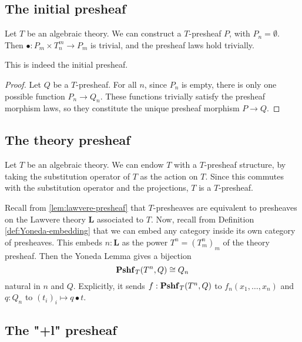 \subsection{The initial presheaf}
\begin{example}
  Let $ T $ be an algebraic theory. We can construct a $ T $-presheaf $ P $, with $ P_n = \emptyset $. Then $ \bullet : P_m \times T_n^m \to P_m $ is trivial, and the presheaf laws hold trivially.
\end{example}

\begin{lemma}
  This is indeed the initial presheaf.
\end{lemma}
\begin{proof}
  Let $ Q $ be a $ T $-presheaf. For all $ n $, since $ P_n $ is empty, there is only one possible function $ P_n \to Q_n $. These functions trivially satisfy the presheaf morphism laws, so they constitute the unique presheaf morphism $ P \to Q $.
\end{proof}

\subsection{The theory presheaf}
\begin{example}
  Let $ T $ be an algebraic theory. We can endow $ T $ with a $ T $-presheaf structure, by taking the substitution operator of $ T $ as the action on $ T $. Since this commutes with the substitution operator and the projections, $ T $ is a $ T $-presheaf.
\end{example}

\begin{remark}\label{rem:presheaf-Yoneda}
  Recall from \ref{lem:lawvere-presheaf} that $ T $-presheaves are equivalent to presheaves on the Lawvere theory $ \mathbf L $ associated to $ T $. Now, recall from Definition \ref{def:Yoneda-embedding} that we can embed any category inside its own category of presheaves. This embeds $ n: \mathbf L $ as the power $ T^n = (T_m^n)_m $ of the theory presheaf. Then the Yoneda Lemma gives a bijection
  \[ \mathbf{Pshf}_{T}(T^n, Q) \cong Q_n \]
  natural in $ n $ and $ Q $. Explicitly, it sends $ f: \mathbf{Pshf}_{T}(T^n, Q) $ to $ f_n(x_1, \dots, x_n) $ and $ q: Q_n $ to $ (t_i)_i \mapsto q \bullet t $.
\end{remark}

\subsection{The "+l" presheaf}

